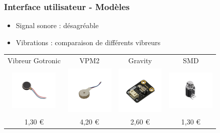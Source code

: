 \documentclass{beamer}
\begin{document}
\begin{frame}
\frametitle{Interface utilisateur - Modèles}
\begin{itemize}
\item Signal sonore : désagréable
\item Vibrations : comparaison de différents vibreurs
\end{itemize}
\bigskip
\begin{tabular}{cccc}
Vibreur Gotronic & VPM2 & Gravity & SMD \\
  \includegraphics[width=2.3cm]{images/gotronic_vib.jpg}
& \includegraphics[width=2.3cm]{images/vpm2.jpg}
& \includegraphics[width=2.3cm]{images/gravity.jpg}
& \includegraphics[width=2.3cm]{images/smd.jpg} \\
1,30 € & 4,20 € & 2,60 € & 1,30 € \\
\end{tabular}
\end{frame}
\end{document}
